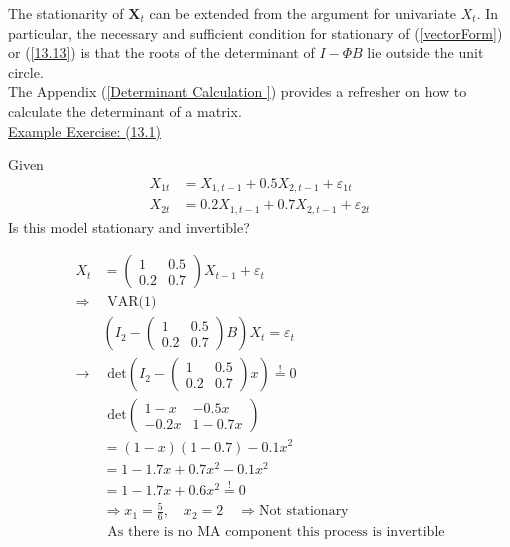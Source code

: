 The stationarity of $\mathbf{X}_t$ can be extended from the argument for univariate $X_t$. In particular, the necessary and sufficient condition for stationary of (\ref{vectorForm}) or (\ref{13.13}) is that the roots of the determinant of $I-\Phi B$ lie outside the unit circle. \\

The Appendix (\ref{Determinant Calculation }) provides a refresher on how to calculate the determinant of a matrix.\\



\underline{Example Exercise: (13.1)} \\
\begin{footnotesize}
    

\quad Given \begin{align*}
    X_{1t} &= X_{1,t-1}+0.5X_{2,t-1} + \varepsilon_{1t}\\
    X_{2t} &= 0.2 X_{1,t-1} + 0.7 X_{2,t-1} + \varepsilon_{2t}
\end{align*} \quad Is this model stationary and invertible?

\begin{align*}
    X_t &= \begin{pmatrix}
        1 & 0.5 \\
        0.2 & 0.7
    \end{pmatrix}X_{t-1} + \varepsilon_t \\
    \Rightarrow &\text{ VAR(1)} \\
    & \left(I_2 - \begin{pmatrix}
        1 & 0.5 \\
        0.2 & 0.7
    \end{pmatrix}B\right)X_t = \varepsilon_t \\
    \rightarrow &\text{ det}\left(I_2 - \begin{pmatrix}
        1 & 0.5 \\
        0.2 & 0.7
    \end{pmatrix}x\right) \overset{!}{=} 0 \\
    &\text{ det}\begin{pmatrix}
        1-x & -0.5x \\
        -0.2x & 1-0.7x
    \end{pmatrix} \\
    &= (1-x)(1-0.7)-0.1x^2 \\
    &= 1-1.7x + 0.7x^2 -0.1x^2 \\
    &= 1-1.7x + 0.6x^2 \overset{!}{=} 0\\
&\Rightarrow x_1 = \frac{5}{6}, \quad x_2 = 2 \quad \Rightarrow\text{Not stationary}\\
&\text{ As there is no MA component this process is invertible}
\end{align*}

\end{footnotesize}


